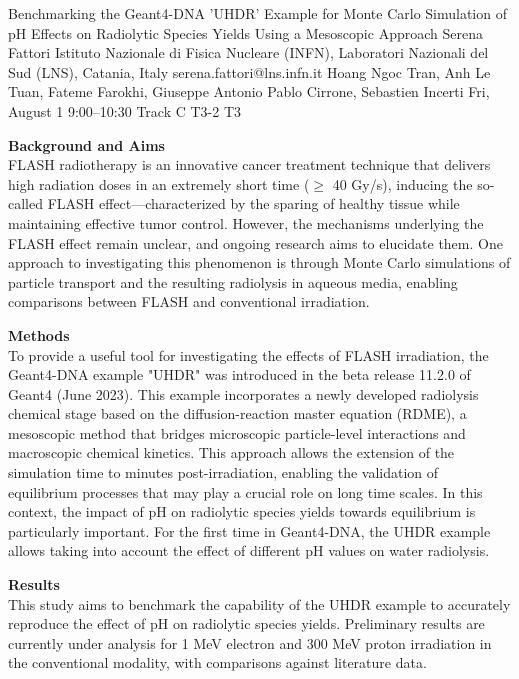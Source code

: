\begin{talk}
  {Benchmarking the Geant4-DNA 'UHDR' Example for Monte Carlo Simulation of pH Effects on Radiolytic Species Yields Using a Mesoscopic Approach}%
  {Serena Fattori}%
  {Istituto Nazionale di Fisica Nucleare (INFN), Laboratori Nazionali del Sud (LNS), Catania, Italy}%
  {serena.fattori@lns.infn.it}%
  {Hoang Ngoc Tran, Anh Le Tuan, Fateme Farokhi, Giuseppe Antonio Pablo Cirrone, Sebastien Incerti}%
  {}%
  {Fri, August 1 9:00–10:30 Track C}%
  {T3-2}%
  {T3}%
			
\textbf{Background and Aims}\\
FLASH radiotherapy is an innovative cancer treatment technique that delivers high radiation doses in an extremely short time ($\geq$ 40 Gy/s), inducing the so-called FLASH effect—characterized by the sparing of healthy tissue while maintaining effective tumor control. However, the mechanisms underlying the FLASH effect remain unclear, and ongoing research aims to elucidate them. One approach to investigating this phenomenon is through Monte Carlo simulations of particle transport and the resulting radiolysis in aqueous media, enabling comparisons between FLASH and conventional irradiation.

\textbf{Methods}\\
To provide a useful tool for investigating the effects of FLASH irradiation, the Geant4-DNA example "UHDR" was introduced in the beta release 11.2.0 of Geant4 (June 2023). This example incorporates a newly developed radiolysis chemical stage based on the diffusion-reaction master equation (RDME), a mesoscopic method that bridges microscopic particle-level interactions and macroscopic chemical kinetics. This approach allows the extension of the simulation time to minutes post-irradiation, enabling the validation of equilibrium processes that may play a crucial role on long time scales. In this context, the impact of pH on radiolytic species yields towards equilibrium is particularly important. For the first time in Geant4-DNA, the UHDR example allows taking into account the effect of different pH values on water radiolysis.

\textbf{Results}\\
This study aims to benchmark the capability of the UHDR example to accurately reproduce the effect of pH on radiolytic species yields. Preliminary results are currently under analysis for 1 MeV electron and 300 MeV proton irradiation in the conventional modality, with comparisons against literature data.


\end{talk}
